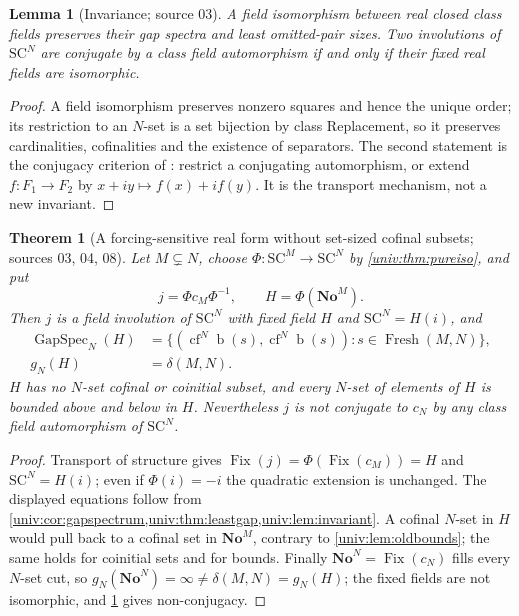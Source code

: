 \documentclass[11pt,letterpaper]{article}
\numberwithin{equation}{section}
\newtheorem{theorem}{Theorem}[section]
\newtheorem{lemma}[lemma]{Lemma}
\theoremstyle{definition}
\theoremstyle{remark}
\newcommand{\No}{\mathbf{No}}
\newcommand{\SC}{\mathrm{SC}}
\newcommand{\NoM}{\No^{M}}
\newcommand{\NoN}{\No^{N}}
\newcommand{\SCM}{\SC^{M}}
\newcommand{\SCN}{\SC^{N}}
\newcommand{\bd}{\operatorname{b}}
\newcommand{\cf}{\operatorname{cf}}
\newcommand{\Fix}{\operatorname{Fix}}
\newcommand{\Fresh}{\operatorname{Fresh}}
\newcommand{\GapSpec}{\operatorname{GapSpec}}
\begin{document}
\begin{lemma}[Invariance; source 03]\label{univ:lem:invariant}
A field isomorphism between real closed class fields preserves their gap
spectra and least omitted-pair sizes. Two involutions of $\SCN$ are conjugate
by a class field automorphism if and only if their fixed real fields are
isomorphic.
\end{lemma}
\begin{proof}
A field isomorphism preserves nonzero squares and hence the unique order; its
restriction to an $N$-set is a set bijection by class Replacement, so it
preserves cardinalities, cofinalities and the existence of separators. The
second statement is the conjugacy criterion of :
restrict a conjugating automorphism, or extend $f:F_1\to F_2$ by
$x+iy\mapsto f(x)+if(y)$. It is the transport mechanism, not a new invariant.
\end{proof}

\begin{theorem}[A forcing-sensitive real form without set-sized cofinal subsets; sources 03, 04, 08]\label{univ:thm:transport}
Let $M\subsetneq N$, choose $\Phi:\SCM\to\SCN$ by \cref{univ:thm:pureiso}, and put
\[
 j=\Phi c_M\Phi^{-1},\qquad H=\Phi(\NoM).
\]
Then $j$ is a field involution of $\SCN$ with fixed field $H$ and
$\SCN=H(i)$, and
\begin{align}
 \GapSpec_N(H)
 &=\{(\cf^N\bd(s),\cf^N\bd(s)):s\in\Fresh(M,N)\},\label{univ:eq:realformspectrum}\\
 g_N(H)&=\delta(M,N).\label{univ:eq:realformmin}
\end{align}
$H$ has no $N$-set cofinal or coinitial subset, and every $N$-set of elements
of $H$ is bounded above and below in $H$. Nevertheless $j$ is not conjugate to
$c_N$ by any class field automorphism of $\SCN$.
\end{theorem}
\begin{proof}
Transport of structure gives $\Fix(j)=\Phi(\Fix(c_M))=H$ and $\SCN=H(i)$; even
if $\Phi(i)=-i$ the quadratic extension is unchanged. The displayed equations
follow from \cref{univ:cor:gapspectrum,univ:thm:leastgap,univ:lem:invariant}.
A cofinal $N$-set in $H$ would pull back to a cofinal set in $\NoM$, contrary
to \cref{univ:lem:oldbounds}; the same holds for coinitial sets and for
bounds. Finally $\NoN=\Fix(c_N)$ fills every $N$-set cut, so
$g_N(\NoN)=\infty\ne\delta(M,N)=g_N(H)$; the fixed fields are not isomorphic,
and \cref{univ:lem:invariant} gives non-conjugacy.
\end{proof}
\end{document}
